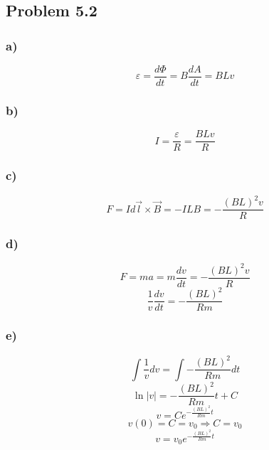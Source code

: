 \documentclass[../homework.tex]{subfiles}
\begin{document}
\subsection{Problem 5.2}
\subsubsection*{a)}
\begin{equation*}
    \varepsilon = \frac{d\Phi}{dt} = B \frac{dA}{dt}
    = B L v
\end{equation*}
\subsubsection*{b)}
\begin{equation*}
    I = \frac{\varepsilon}{R} = \frac{BLv}{R}
\end{equation*}

\subsubsection*{c)}
\begin{equation*}
    F = I d\vec{l} \times \vec{B} = -ILB = -\frac{(BL)^2v}{R}
\end{equation*}

\subsubsection{d)}
\begin{equation*}
    F = ma = m \frac{dv}{dt} = -\frac{(BL)^2v}{R}
\end{equation*}
\begin{equation*}
    \frac{1}{v}\frac{dv}{dt} = -\frac{(BL)^2}{Rm}
\end{equation*}

\subsubsection*{e)}
\begin{equation*}
    \int \frac{1}{v} dv = \int -\frac{(BL)^2}{Rm} dt
\end{equation*}
\begin{equation*}
    \ln|v| = -\frac{(BL)^2}{Rm} t + C
\end{equation*}
\begin{equation*}
    v = Ce^{-\frac{(BL)^2}{Rm}t}
\end{equation*}
\begin{equation*}
    v(0) = C = v_0 \Rightarrow C = v_0
\end{equation*}
\begin{equation*}
    v = v_0 e^{-\frac{(BL)^2}{Rm}t}
\end{equation*}
\end{document}
